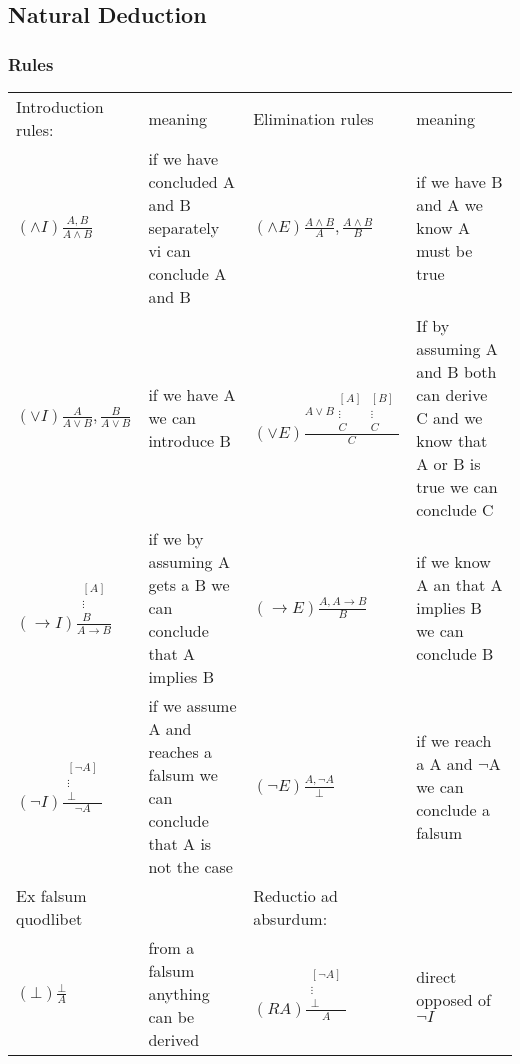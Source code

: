 \documentclass[10pt,a4paper]{article}
\begin{document}
	\subsection{Natural Deduction}
	\subsubsection{Rules}
	{
	\begin{tabular}{m{3cm} p{4cm} m{3cm} p{4cm}}
		
		Introduction rules: & meaning	& Elimination rules & meaning\\ 
		$ \left( \land I\right) \frac{A,B}{A\land B} $ & \normalsize if we have concluded A and B separately vi can conclude A and B	& $\left( \land E\right) \frac{A \land B}{A}, \frac{A \land B}{B} $ & \normalsize if we have B and A we know A must be true  \\[1cm]  
		\hline
		$ \left( \lor I\right) \frac{A}{A\lor B} , \frac{B}{A\lor B} $ & \normalsize if we have A we can introduce B & $(\lor E) \frac{A \lor B \begin{matrix}
			[A] & [B]  \\
			\vdots & \vdots  \\
			C & C
			\end{matrix}}{C} $ & \normalsize If by assuming A and B both can derive C and we know that A or B is true we can conclude C
		
		\\[1cm]
		\hline
		$(\to I) \frac{\begin{matrix}
			[A]  \\
			\vdots   \\
			B 
			\end{matrix}}{A\to B} $ & \normalsize if we by assuming A gets a B we can conclude that A implies B & $ (\to E) \frac{A,A\to B}{B} $ & if we know A an that A implies B we can conclude B \\[1cm] 
		\hline
		$ (\neg I) \frac{\begin{matrix}
			[\neg A]  \\
			\vdots   \\
			\bot 
			\end{matrix}}{\neg A} $ & \normalsize if we assume A and reaches a falsum we can conclude that A is not the case & $ (\neg E) \frac{A,\neg A}{\bot} $ & if we reach a A and $ \neg $A we can conclude a falsum\\[1cm]
		\hline
		Ex falsum quodlibet & & Reductio ad absurdum:\\ 
		$ (\bot ) \frac{\bot}{A} $ & from a falsum anything can be derived & $ (RA) \frac{\begin{matrix}
			[\neg A]  \\
			\vdots   \\
			\bot 
			\end{matrix}}{A} $ & direct opposed of $ \neg I $
	

\end{tabular}}
\end{document}
